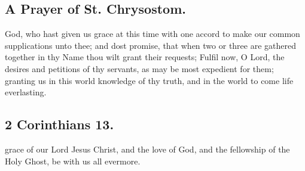 \subsection{A Prayer of St. Chrysostom.}

 God, who hast given us grace at this time with one accord to make our common supplications unto thee; and dost promise, that when two or three are gathered together in thy Name thou wilt grant their requests; Fulfil now, O Lord, the desires and petitions of thy servants, as may be most expedient for them; granting us in this world knowledge of thy truth, and in the world to come life everlasting.

\subsection{2 Corinthians 13.}

 grace of our Lord Jesus Christ, and the love of God, and the fellowship of the Holy Ghost, be with us all evermore.
